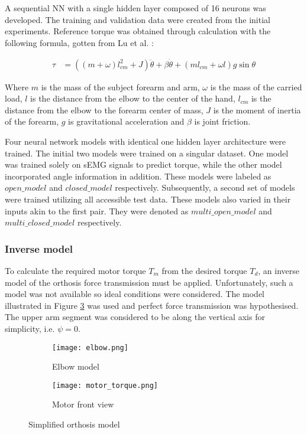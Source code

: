 A sequential NN with a single hidden layer composed of 16 neurons was developed. 
The training and validation data were created from the initial experiments. 
Reference torque was obtained through calculation with the following formula, 
gotten from Lu et al. \cite{lu_development_2019}: 

\begin{align*}
  \tau&=((m+\omega)l_{cm}^2+J)\ddot{\theta}+\beta \dot{\theta}+(ml_{cm}+\omega l)g\sin{\theta}
\end{align*}  

Where $m$ is the mass of the subject forearm and arm, $\omega$ is the mass of 
the carried load, $l$ is the distance from the elbow to the center of the hand,
$l_{cm}$ is the distance from the elbow to the forearm center of mass, $J$ is 
the moment of inertia of the forearm, $g$ is gravitational acceleration and 
$\beta$ is joint friction.  

Four neural network models with identical one hidden layer architecture were trained. 
The initial two models were trained on a singular dataset. One model was trained 
solely on sEMG signals to predict torque, while the other model incorporated angle 
information in addition. These models were labeled as $open\_model$ and $closed\_model$ 
respectively. Subsequently, a second set of models were trained utilizing all 
accessible test data. These models also varied in their inputs akin to the first 
pair. They were denoted as $multi\_open\_model$ and $multi\_closed\_model$ respectively.
\FloatBarrier

\subsubsection{Inverse model}
To calculate the required motor torque $T_m$ from the desired torque $T_d$, 
an inverse model of the orthosis force transmission must be applied. Unfortunately, 
such a model was not available so ideal conditions were considered. The model 
illustrated in Figure \ref{fig:orthosis_model} was used and perfect force 
transmission was hypothesised. The upper arm segment was considered to be along the 
vertical axis for simplicity, i.e. $\psi=0$.  

\begin{figure}[htbp]
    \centering
    \begin{subfigure}{0.2\textwidth}
        \centering
        \texttt{[image: elbow.png]}
        \caption{Elbow model}
        \label{fig:elbow}
    \end{subfigure}
    \begin{subfigure}{0.3\textwidth}
        \centering
        \texttt{[image: motor\_torque.png]}
        \caption{Motor front view}
        \label{fig:motor}
    \end{subfigure}
    \caption{
      Simplified orthosis model
    }
    \label{fig:orthosis_model}
\end{figure}

